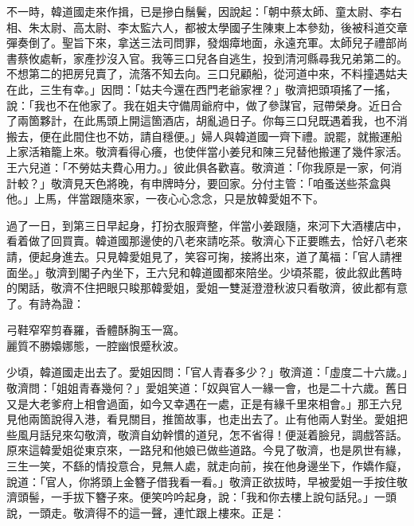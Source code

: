 不一時，韓道國走來作揖，已是摻白鬚鬢，{}因說起：「朝中蔡太師、童太尉、李右相、朱太尉、高太尉、李太監六人，都被太學國子生陳東上本參劾，後被科道交章彈奏倒了。{}聖旨下來，拿送三法司問罪，發烟瘴地面，永遠充軍。太師兒子禮部尚書蔡攸處斬，家產抄沒入官。我等三口兒各自逃生，投到清河縣尋我兄弟第二的。不想第二的把房兒賣了，流落不知去向。三口兒顧船，從河道中來，不料撞遇姑夫在此，三生有幸。」因問：「姑夫今還在西門老爺家裡？」敬濟把頭項搖了一搖，說：「我也不在他家了。{}我在姐夫守備周爺府中，做了參謀官，冠帶榮身。近日合了兩箇夥計，在此馬頭上開這箇酒店，胡亂過日子。你每三口兒既遇着我，也不消搬去，便在此間住也不妨，請自穩便。」婦人與韓道國一齊下禮。說罷，就搬運船上家活箱籠上來。敬濟看得心癢，也使伴當小姜兒和陳三兒替他搬運了幾件家活。{}王六兒道：「不勞姑夫費心用力。」彼此俱各歡喜。敬濟道：「你我原是一家，何消計較？」敬濟見天色將晚，有申牌時分，要回家。分付主管：「咱蚤送些茶盒與他。」上馬，伴當跟隨來家，一夜心心念念，只是放韓愛姐不下。

過了一日，到第三日早起身，打扮衣服齊整，伴當小姜跟隨，來河下大酒樓店中，看着做了回買賣。韓道國那邊使的八老來請吃茶。敬濟心下正要瞧去，恰好八老來請，便起身進去。只見韓愛姐見了，笑容可掬，{}接將出來，道了萬福：「官人請裡面坐。」敬濟到閣子內坐下，王六兒和韓道國都來陪坐。少頃茶罷，彼此叙此舊時的閑話，敬濟不住把眼只睃那韓愛姐，愛姐一雙涎澄澄秋波只看敬濟，{}彼此都有意了。有詩為證：

\begin{myquote}
弓鞋窄窄剪春羅，香體酥胸玉一窩。\\麗質不勝嬝娜態，一腔幽恨蹙秋波。
\end{myquote}

少頃，韓道國走出去了。愛姐因問：「官人青春多少？」敬濟道：「虛度二十六歲。」敬濟問：「姐姐青春幾何？」愛姐笑道：「奴與官人一緣一會，也是二十六歲。舊日又是大老爹府上相會過面，如今又幸遇在一處，正是有緣千里來相會。」{}那王六兒見他兩箇說得入港，看見關目，推箇故事，也走出去了。{}止有他兩人對坐。愛姐把些風月話兒來勾敬濟，敬濟自幼幹慣的道兒，怎不省得！便涎着臉兒，調戲答話。原來這韓愛姐從東京來，一路兒和他娘已做些道路。{}今見了敬濟，也是夙世有緣，三生一笑，不繇的情投意合，見無人處，就走向前，挨在他身邊坐下，作嬌作癡，說道：「官人，你將頭上金簪子借我看一看。」敬濟正欲拔時，早被愛姐一手按住敬濟頭髻，一手拔下簪子來。{}便笑吟吟起身，說：「我和你去樓上說句話兒。」一頭說，一頭走。敬濟得不的這一聲，連忙跟上樓來。正是：

